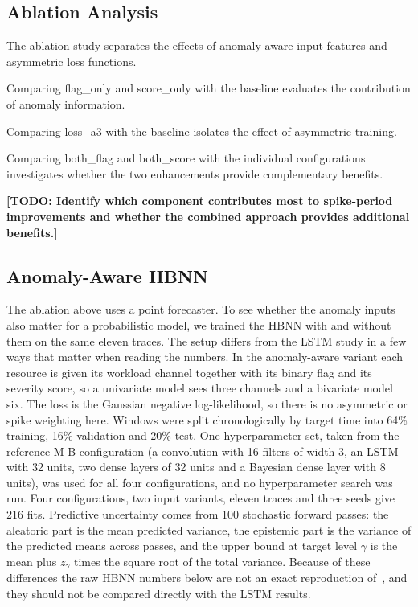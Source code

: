 \documentclass[conference]{IEEEtran}
\newcommand{\todo}[1]{{\color{red}\textbf{[TODO: #1]}}}
\begin{document}
\subsection{Ablation Analysis}

The ablation study separates the effects of anomaly-aware input features and asymmetric loss functions.

Comparing flag\_only and score\_only with the baseline evaluates the contribution of anomaly information.

Comparing loss\_a3 with the baseline isolates the effect of asymmetric training.

Comparing both\_flag and both\_score with the individual configurations investigates whether the two enhancements provide complementary benefits.

\todo{Identify which component contributes most to spike-period improvements and whether the combined approach provides additional benefits.}

\subsection{Anomaly-Aware HBNN}
\label{sec:hbnn_results}

The ablation above uses a point forecaster. To see whether the anomaly inputs also matter for a probabilistic model, we trained the HBNN with and without them on the same eleven traces. The setup differs from the LSTM study in a few ways that matter when reading the numbers. In the anomaly-aware variant each resource is given its workload channel together with its binary flag and its severity score, so a univariate model sees three channels and a bivariate model six. The loss is the Gaussian negative log-likelihood, so there is no asymmetric or spike weighting here. Windows were split chronologically by target time into 64\% training, 16\% validation and 20\% test. One hyperparameter set, taken from the reference M-B configuration (a convolution with 16 filters of width 3, an LSTM with 32 units, two dense layers of 32 units and a Bayesian dense layer with 8 units), was used for all four configurations, and no hyperparameter search was run. Four configurations, two input variants, eleven traces and three seeds give 216 fits. Predictive uncertainty comes from 100 stochastic forward passes: the aleatoric part is the mean predicted variance, the epistemic part is the variance of the predicted means across passes, and the upper bound at target level $\gamma$ is the mean plus $z_\gamma$ times the square root of the total variance. Because of these differences the raw HBNN numbers below are not an exact reproduction of~\cite{rossi2025}, and they should not be compared directly with the LSTM results.
\end{document}
